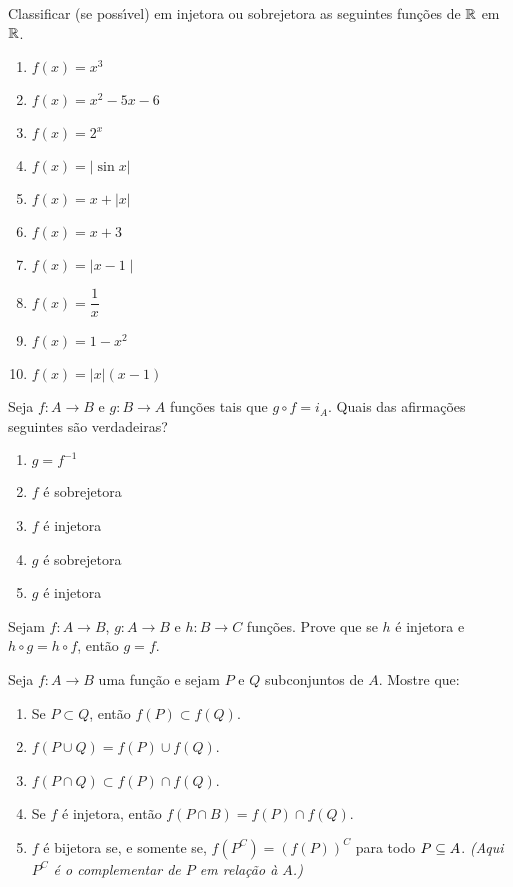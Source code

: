 \documentclass[12pt]{article}
\begin{document}
\newpage

\questao Classificar (se poss{\'\i}vel) em injetora ou sobrejetora as seguintes fun{\c c}{\~o}es de $\mathbb{R}$ em $\mathbb{R}$.

\begin{multicols}{2}
	\begin{enumerate}[label={\alph*})]
		\item $f(x) = x^3$
		\item $f(x) = x^2 - 5x - 6$
		\item $f(x) = 2^x$
		\item $f(x) = | \sin x |$
		\item $f(x) = x + | x |$
		\item $f(x) = x + 3$
		\item $f(x) = \mid x - 1\mid$
		\item $f(x) = \dfrac{1}{x}$
		\item $f(x) = 1 - x^2$
		\item $f(x) = |x|(x - 1)$
	\end{enumerate}
\end{multicols}

\vesp

\questao Seja $f : A \to B$ e $g : B \to A$ funções tais que $g \circ f = i_A$. Quais das afirmações seguintes são verdadeiras?
\begin{enumerate}[label={\alph*})]
	\item $g = f^{-1}$
	\item $f$ é sobrejetora
	\item $f$ é injetora
	\item $g$ é sobrejetora
	\item $g$ é injetora
\end{enumerate}


\vesp

\questao Sejam $f : A \to B$, $g : A \to B$ e $h : B \to C$ funções. Prove que se $h$ é injetora e $h \circ g = h \circ f$, então $g = f$.

\vesp

\questao Seja $f : A \to B$ uma função e sejam $P$ e $Q$ subconjuntos de $A$. Mostre que:
\begin{enumerate}[label={\alph*})]
	\item Se $P\subset Q$, ent{\~a}o $f(P)\subset f(Q)$.
	\item $f(P\cup Q) = f(P)\cup f(Q)$.
	\item $f(P\cap Q)\subset f(P)\cap f(Q)$.
	\item Se $f$ {\'e} injetora, ent{\~a}o $f(P\cap B) =  f(P)\cap f(Q)$.
	\item $f$ {\'e} bijetora se, e somente se, $f(P^C) = (f(P))^C$ para todo $P \subseteq A$. \textit{(Aqui $P^C$ é o complementar de $P$ em relação à $A$.)}
\end{enumerate}
\end{document}
